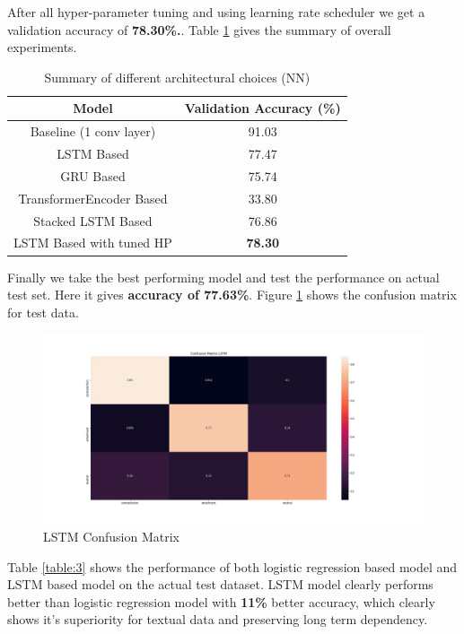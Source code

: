 \documentclass[10pt,a4paper]{article}
\begin{document}
After all hyper-parameter tuning and using learning rate scheduler we get a validation accuracy of \textbf{78.30\%.}. Table \ref{table:2} gives the summary of overall experiments.

\begin{table}[h!]
\centering
\begin{tabular}{|c| c|} 
 \hline
 Model & Validation Accuracy (\%) \\
 \hline\hline
 Baseline (1 conv layer) & 91.03 \\ 
 \hline
LSTM Based & 77.47 \\ 
 \hline
 GRU Based & 75.74 \\ 
 \hline
TransformerEncoder Based & 33.80 \\ 
 \hline
Stacked LSTM Based  & 76.86 \\ 
 \hline
LSTM Based with tuned HP & \textbf{78.30} \\ 
 \hline
\end{tabular}
\caption{Summary of different architectural choices (NN) }
\label{table:2}
\end{table}

Finally we take the best performing model and test the performance on actual test set. Here it gives \textbf{accuracy of 77.63\%}. Figure \ref{nncm} shows the confusion matrix for test data. 

\begin{figure}[h!]
	\includegraphics[width=1.3\linewidth]{../img/cm_lstm.jpg}
	\caption{LSTM Confusion Matrix}
	\label{nncm}
\end{figure}

\pagebreak

Table \ref{table:3} shows the performance of both logistic regression based model and LSTM based model on the actual test dataset. LSTM model clearly performs better than logistic regression model with \textbf{11\%} better accuracy, which clearly shows it's superiority for textual data and preserving long term dependency.
\end{document}

